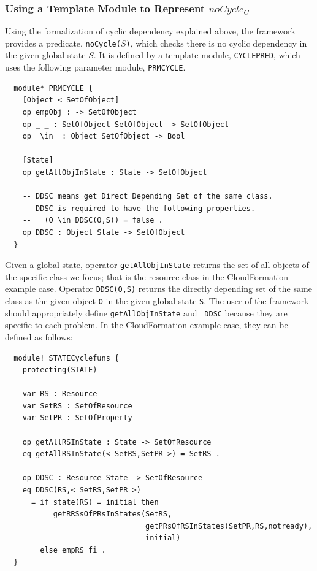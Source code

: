\documentclass[12pt]{report}
\newcommand{\stt}[1]{{\small{\tt {#1}}}}
\begin{document}
\subsubsection{Using a Template Module to Represent $noCycle_C$}
Using the formalization of cyclic dependency explained above, the
framework provides a predicate, \stt{noCycle($S$)}, which checks there
is no cyclic dependency in the given global state $S$. It is defined
by a template module, {\tt CYCLEPRED}, which uses the following
parameter module, {\tt PRMCYCLE}.
\begin{verbatim}
  module* PRMCYCLE {
    [Object < SetOfObject]
    op empObj : -> SetOfObject
    op _ _ : SetOfObject SetOfObject -> SetOfObject
    op _\in_ : Object SetOfObject -> Bool
  
    [State]
    op getAllObjInState : State -> SetOfObject
  
    -- DDSC means get Direct Depending Set of the same class.
    -- DDSC is required to have the following properties.
    --   (O \in DDSC(O,S)) = false .
    op DDSC : Object State -> SetOfObject
  }
\end{verbatim}
Given a global state, operator {\tt getAllObjInState} returns the set
of all objects of the specific class we focus; that is the resource
class in the CloudFormation example case. Operator \stt{DDSC(O,S)}
returns the directly depending set of the same class as the given
object {\tt O} in the given global state {\tt S}. The user of the
framework should appropriately define {\tt getAllObjInState} and {\tt
  DDSC} because they are specific to each problem. In the
CloudFormation example case, they can be defined as follows:
\begin{verbatim}
  module! STATECyclefuns {
    protecting(STATE)
  
    var RS : Resource
    var SetRS : SetOfResource
    var SetPR : SetOfProperty
  
    op getAllRSInState : State -> SetOfResource
    eq getAllRSInState(< SetRS,SetPR >) = SetRS .
  
    op DDSC : Resource State -> SetOfResource
    eq DDSC(RS,< SetRS,SetPR >)
      = if state(RS) = initial then
           getRRSsOfPRsInStates(SetRS,
                                getPRsOfRSInStates(SetPR,RS,notready),
                                initial)
        else empRS fi .
  }
\end{verbatim}
\end{document}
